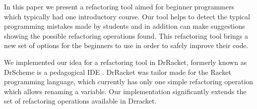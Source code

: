 In this paper we present a refactoring tool aimed for beginner programmers which typically
had one introductory course.
Our tool helps to detect the typical programming mistakes made by students and in
addition can make suggestions showing the possible refactoring operations found.
This refactoring tool brings a new set of options for the beginners to use
in order to safely improve their code.


We implemented our idea for a refactoring tool in DrRacket, formerly known as
DrScheme is a pedagogical IDE \cite{drscheme}\cite{drscheme_pegadogy}.
DrRacket was tailor made for the Racket programming language, which currently
has only one simple refactoring operation which allows renaming a variable.
Our implementation significantly extends the set of refactoring operations available
in Drracket.
